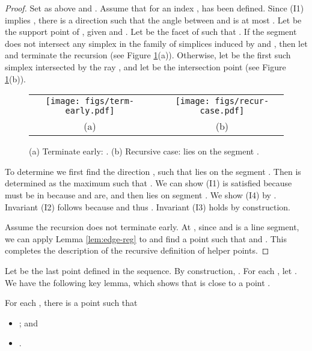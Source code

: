 \documentclass[11pt]{myclass}
\begin{document}
\begin{proof} 
Set  as above and .    
Assume that for an index ,  has been defined.  
Since (I1) implies , 
there is a direction  such that the angle between  and  is at most .  
Let  be the support point of , given  and . 
Let  be the facet of  such that .  If the segment  does not intersect any simplex in the family of  simplices induced by  and , then let  and terminate the recursion (see Figure \ref{fig:recursive_def}(a)).  
Otherwise, let  be the first such simplex intersected by the ray , and let  be the intersection point (see Figure \ref{fig:recursive_def}(b)).  
  
\begin{figure}[htb!]
\begin{center}
{\small 
\begin{tabular}{ccc}
\texttt{[image: figs/term-early.pdf]} 
& \hspace{1cm} & 
\texttt{[image: figs/recur-case.pdf]} \\
(a)  && (b) 
\end{tabular}
}
\end{center}
\caption{(a) Terminate early: . (b) Recursive case:  lies on the segment . }
\label{fig:recursive_def}
\end{figure}

To determine  we first find the direction , such that  lies on the segment .  Then  is determined as the maximum  such that . 
We can show (I1) is satisfied because  must be in  because  and  are, and then  lies on segment .  
We show (I4) by .  Invariant (I2) follows because  and thus .  
Invariant (I3) holds by construction.   

Assume the recursion does not terminate early.  At , since  and  is a line segment, we can apply Lemma \ref{lem:edge-reg} to  and find a point  such that  and .  
This completes the description of the recursive definition of helper points.  
\end{proof}



Let  be the last point defined in the sequence. By construction, .  
For each , let .
We have the following key lemma, which shows that  is close to a point .


\begin{lemma} \label{lem:key}
 For each , there is a point  such that 
 \begin{itemize} \denselist 
   \item[(1)] ; and  
   \item[(2)] . 
 \end{itemize}
\end{lemma}
\end{document}
